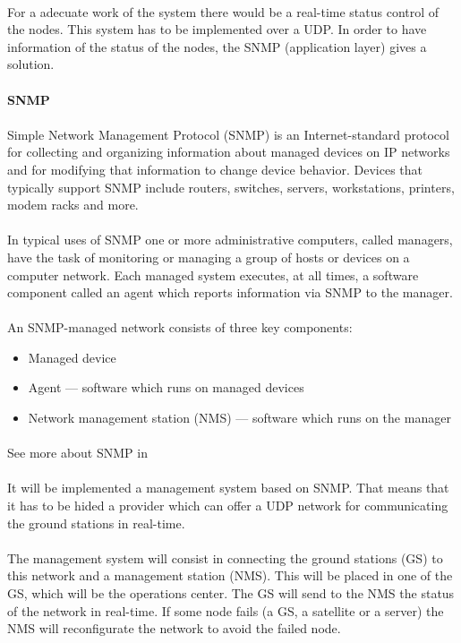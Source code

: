 \paragraph{}
For a adecuate work of the system there would be a real-time status control of the nodes. This system has to be implemented over a UDP. In order to have information of the status of the nodes, the SNMP (application layer) gives a solution.

\paragraph{} \textbf{SNMP}
\paragraph{} 
Simple Network Management Protocol (SNMP) is an Internet-standard protocol for collecting and organizing information about managed devices on IP networks and for modifying that information to change device behavior. Devices that typically support SNMP include routers, switches, servers, workstations, printers, modem racks and more.
\paragraph{}
In typical uses of SNMP one or more administrative computers, called managers, have the task of monitoring or managing a group of hosts or devices on a computer network. Each managed system executes, at all times, a software component called an agent which reports information via SNMP to the manager.
\paragraph{}
An SNMP-managed network consists of three key components:
\begin{itemize}
\item Managed device
\item Agent — software which runs on managed devices
\item Network management station (NMS) — software which runs on the manager
\end{itemize}
\paragraph{}
See more about SNMP in \cite{SNMP}


\paragraph{}
It will be implemented a management system based on SNMP. That means that it has to be hided a provider which can offer a UDP network for communicating the ground stations in real-time. 
\paragraph{}
The management system will consist in connecting the ground stations (GS) to this network and a management station (NMS). This will be placed in one of the GS, which will be the operations center. The GS will send to the NMS the status of the network in real-time. If some node fails (a GS, a satellite or a server) the NMS will reconfigurate the network to avoid the failed node. 
